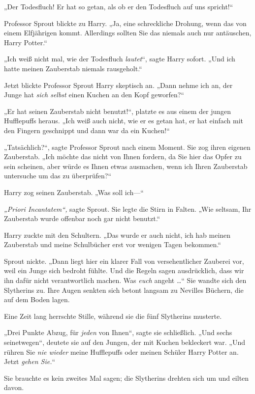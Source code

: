 {„Der Todesfluch! Er hat so getan, als ob er den Todesfluch auf uns spricht!“

Professor Sprout blickte zu Harry. „Ja, eine schreckliche Drohung, wenn das von einem Elfjährigen kommt. Allerdings sollten Sie das niemals auch nur antäuschen, Harry Potter.“

„Ich weiß nicht mal, wie der Todesfluch \emph{lautet}“, sagte Harry sofort. „Und ich hatte meinen Zauberstab niemals rausgeholt.“

Jetzt blickte Professor Sprout Harry skeptisch an. „Dann nehme ich an, der Junge hat \emph{sich selbst} einen Kuchen an den Kopf geworfen?“

„Er hat seinen Zauberstab nicht benutzt!“, platzte es aus einem der jungen Hufflepuffs heraus. „Ich weiß auch nicht, wie er es getan hat, er hat einfach mit den Fingern geschnippt und dann war da ein Kuchen!“

„Tatsächlich?“, sagte Professor Sprout nach einem Moment. Sie zog ihren eigenen Zauberstab. „Ich möchte das nicht von Ihnen fordern, da Sie hier das Opfer zu sein scheinen, aber würde es Ihnen etwas ausmachen, wenn ich Ihren Zauberstab untersuche um das zu überprüfen?“

Harry zog seinen Zauberstab. „Was soll ich—“

\emph{„Priori Incantatem“,} sagte Sprout. Sie legte die Stirn in Falten. „Wie seltsam, Ihr Zauberstab wurde offenbar noch gar nicht benutzt.“

Harry zuckte mit den Schultern. „Das wurde er auch nicht, ich hab meinen Zauberstab und meine Schulbücher erst vor wenigen Tagen bekommen.“

Sprout nickte. „Dann liegt hier ein klarer Fall von versehentlicher Zauberei vor, weil ein Junge sich bedroht fühlte. Und die Regeln sagen ausdrücklich, dass wir ihn dafür nicht verantwortlich machen. Was \emph{euch} angeht …“ Sie wandte sich den Slytherins zu. Ihre Augen senkten sich betont langsam zu Nevilles Büchern, die auf dem Boden lagen.

Eine Zeit lang herrschte Stille, während sie die fünf Slytherins musterte.

„Drei Punkte Abzug, für \emph{jeden} von Ihnen“, sagte sie schließlich. „Und sechs seinetwegen“, deutete sie auf den Jungen, der mit Kuchen bekleckert war. „Und rühren Sie \emph{nie wieder} meine Hufflepuffs oder meinen Schüler Harry Potter an. Jetzt \emph{gehen Sie.}“

Sie brauchte es kein zweites Mal sagen; die Slytherins drehten sich um und eilten davon.

}
